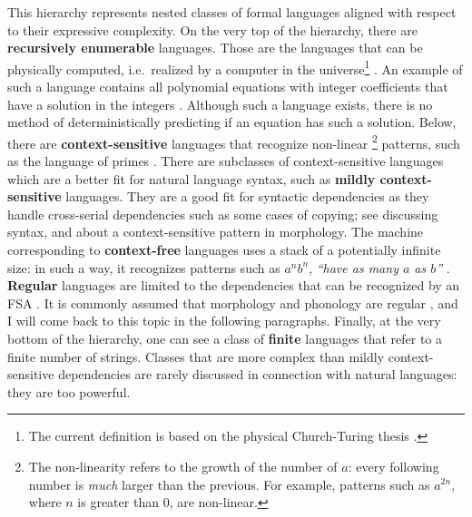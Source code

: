 This hierarchy represents nested classes of formal languages aligned with respect to their expressive complexity.
On the very top of the hierarchy, there are \textbf{recursively enumerable} languages.
Those are the languages that can be physically computed, i.e.\ realized by a computer in the universe\footnote{The current definition is based on the physical Church-Turing thesis \citep{Church1936,Turing1937a,Turing1937b}.} \citep{Chomsky1956}.
An example of such a language contains all polynomial equations with integer coefficients that have a solution in the integers \citep{Goldberg2018}.
Although such a language exists, there is no method of deterministically predicting if an equation has such a solution.
Below, there are \textbf{context-sensitive} languages that recognize non-linear%
\footnote{The non-linearity refers to the growth of the number of $a$: every following number is \emph{much} larger than the previous.
For example, patterns such as $a^{2n}$, where $n$ is greater than $0$, are non-linear.}
patterns, such as the language of primes \citep{HartmanisShank1968}.
There are subclasses of context-sensitive languages which are a better fit for natural language syntax, such as \textbf{mildly context-sensitive} languages.
They are a good fit for syntactic dependencies as they handle cross-serial dependencies such as some cases of copying; see \citep{Huybregts1984,Joshi1985,Shieber1985,Kallmeyer2010} discussing syntax, and \citep{Culy1985} about a context-sensitive pattern in morphology.
The machine corresponding to \textbf{context-free} languages uses a stack of a potentially infinite size: in such a way, it recognizes patterns such as $a^{n}b^{n}$, \emph{``have as many $a$ as $b$''} \citep{HopcroftEtAl2006}.
\textbf{Regular} languages are limited to the dependencies that can be recognized by an FSA \citep{HopcroftEtAl2006}.
It is commonly assumed that morphology and phonology are regular \citep{Johnson1972,KaplanKay94,BeesleyKartunnen03,RoarkSproat2007}, and I will come back to this topic in the following paragraphs.
Finally, at the very bottom of the hierarchy, one can see a class of \textbf{finite} languages that refer to a finite number of strings.
Classes that are more complex than mildly context-sensitive dependencies are rarely discussed in connection with natural languages: they are too powerful.

